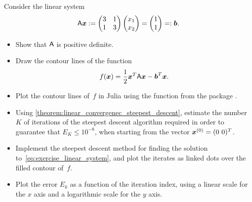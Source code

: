 \begin{compexercise}
    Consider the linear system
    \begin{equation}
        \label{eq:exercise_linear_system}
        \mathsf A \mathbf{\boldsymbol{x}} :=
        \begin{pmatrix}
            3 & 1 \\ 1 & 3
        \end{pmatrix}
        \begin{pmatrix}
            x_1 \\
            x_2
        \end{pmatrix}
        =
        \begin{pmatrix}
            1 \\
            1
        \end{pmatrix} =: \mathbf{\boldsymbol{b}}.
    \end{equation}
    \begin{itemize}
        \item
            Show that $\mathsf A$ is positive definite.

        \item
            Draw the contour lines of the function
            \[
                f(\mathbf{\boldsymbol{x}}) = \frac{1}{2} \mathbf{\boldsymbol{x}}^T \mathsf A \mathbf{\boldsymbol{x}} - \mathbf{\boldsymbol{b}}^T \mathbf{\boldsymbol{x}}.
            \]

        \item
            Plot the contour lines of~$f$ in Julia using the function  from the package .

        \item
            Using \cref{theorem:linear_convergenec_steepest_descent},
            estimate the number~$K$ of iterations of the steepest descent algorithm required in order to guarantee that $E_K \leq 10^{-8}$,
            when starting from the vector $\mathbf{\boldsymbol{x}}^{(0)} = (0~0)^T$.

        \item
            Implement the steepest descent method for finding the solution to~\eqref{eq:exercise_linear_system},
            and plot the iterates as linked dots over the filled contour of~$f$.

        \item
            Plot the error $E_k$ as a function of the iteration index,
            using a linear scale for the $x$ axis and a logarithmic scale for the $y$ axis.
    \end{itemize}
\end{compexercise}
